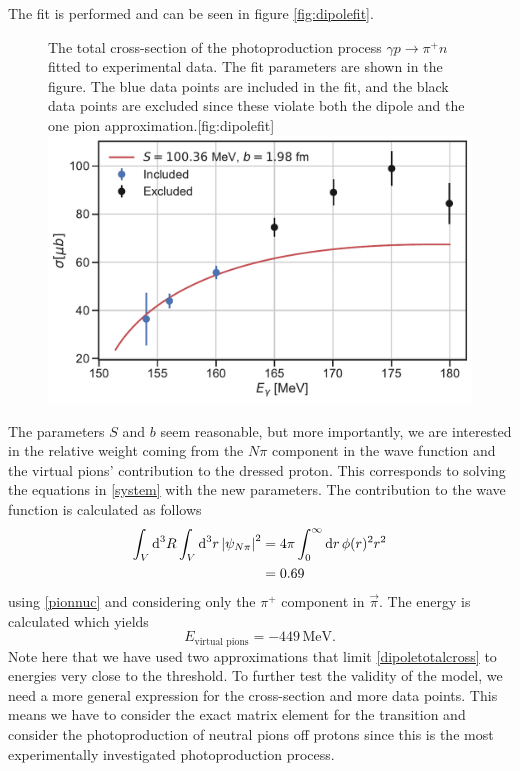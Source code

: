 The fit is performed and can be seen in figure \ref{fig:dipolefit}.
\begin{figure}[H]
	\begin{sidecaption}{The total cross-section of the photoproduction process $\gamma p \rightarrow \pi^+ n$ fitted to experimental data. The fit parameters are shown in the figure. The blue data points are included in the fit, and the black data points are excluded since these violate both the dipole and the one pion approximation.}[fig:dipolefit]
		\includegraphics[width=\linewidth]{Figures/dipole_approximation.pdf}
	\end{sidecaption}
\end{figure}
The parameters $S$ and $b$ seem reasonable, but more importantly, we are interested in the relative weight coming from the $N\pi$ component in the wave function and the virtual pions' contribution to the dressed proton. This corresponds to solving the equations in \eqref{system} with the new parameters. The contribution to the wave function is calculated as follows
\begin{align}
	\int_V \text{d}^3R \int_V \text{d}^3 r \, \abs{\psi_{N\pi}}^2 &= 4\pi \int_0^\infty \text{d}r \, \phi(r)^2r^2 \\
	&= 0.69
\end{align}
using \eqref{pionnuc} and considering only the $\pi^+$ component in $\vec{\pi}$. The energy is calculated which yields
\begin{equation}
	E_{\text{virtual pions}} = -449 \, \text{MeV}.
\end{equation}
Note here that we have used two approximations that limit \eqref{dipoletotalcross} to energies very close to the threshold. To further test the validity of the model, we need a more general expression for the cross-section and more data points. This means we have to consider the exact matrix element for the transition and consider the photoproduction of neutral pions off protons since this is the most experimentally investigated photoproduction process. 
